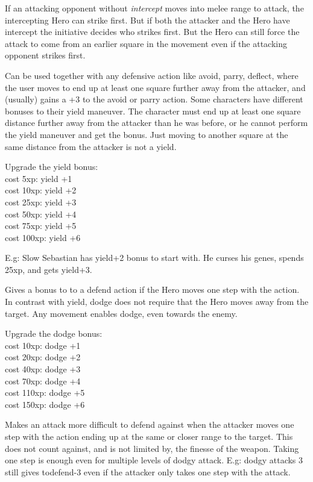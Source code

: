 If an attacking opponent without \emph{intercept} moves into melee range to attack, the intercepting Hero can strike first. But if both the attacker and the Hero have intercept the initiative decides who strikes first. But the Hero can still force the attack to come from an earlier square in the movement even if the attacking opponent strikes first.


Can be used together with any defensive action like avoid, parry, deflect, where the user moves to end up at least one square further away from the attacker, and (usually) gains a +3 to the avoid or parry action. Some characters have different bonuses to their yield maneuver. The character must end up at least one square distance further away from the attacker than he was before, or he cannot perform the yield maneuver and get the bonus. Just moving to another square at the same distance from the attacker is not a yield.

Upgrade the yield bonus: \\
cost   5xp: yield +1 \\
cost  10xp: yield +2 \\
cost  25xp: yield +3 \\
cost  50xp: yield +4 \\
cost  75xp: yield +5 \\
cost 100xp: yield +6

E.g: Slow Sebastian has yield+2 bonus to start with. He curses his genes, spends 25xp, and gets yield+3.


Gives a bonus to to a defend action if the Hero moves one step with the action. In contrast with yield, dodge does not require that the Hero moves away from the target. Any movement enables dodge, even towards the enemy.

Upgrade the dodge bonus:\\
cost  10xp: dodge +1 \\
cost  20xp: dodge +2 \\
cost  40xp: dodge +3 \\
cost  70xp: dodge +4 \\
cost 110xp: dodge +5 \\
cost 150xp: dodge +6


Makes an attack more difficult to defend against when the attacker moves one step with the action ending up at the same or closer range to the target. This does not count against, and is not limited by, the finesse of the weapon. Taking one step is enough even for multiple levels of dodgy attack. E.g: dodgy attacks 3 still gives todefend-3 even if the attacker only takes one step with the attack.

